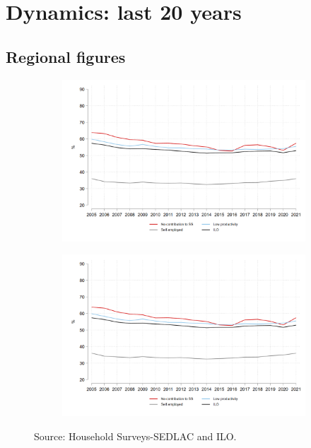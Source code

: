 \documentclass[english]{article}
\begin{document}
     \section{Dynamics: last 20 years}  
       

\subsection{Regional figures}

\begin{figure}[!htb]
\centering
  \caption{Evolution of alternative informality related measures}
\begin{subfigure}{.5\textwidth}
  \centering
  \includegraphics[width=1\linewidth]{latex/figures/Series/LAC_ipo_fig1.png}
  \label{fig:sub1}
\end{subfigure}%
\begin{subfigure}{.5\textwidth}
  \centering
  \includegraphics[width=1\linewidth]{latex/figures/Series/LAC_ipo_fig1.png}
  \label{fig:sub2}
\end{subfigure}
\label{fig:test}
\footnotesize{Source: Household Surveys-SEDLAC and ILO.}

\end{figure}
\end{document}
